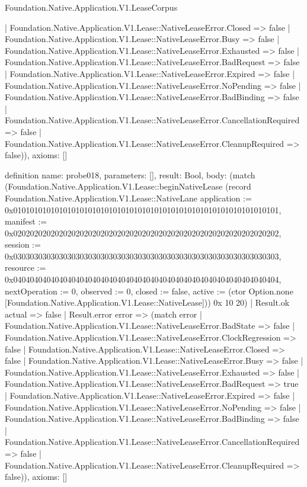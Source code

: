 \begin{lexlean}{Foundation.Native.Application.V1.LeaseCorpus}
\begin{semanticmodule}
{      | Foundation.Native.Application.V1.Lease::NativeLeaseError.Closed => false
      | Foundation.Native.Application.V1.Lease::NativeLeaseError.Busy => false
      | Foundation.Native.Application.V1.Lease::NativeLeaseError.Exhausted => false
      | Foundation.Native.Application.V1.Lease::NativeLeaseError.BadRequest => false
      | Foundation.Native.Application.V1.Lease::NativeLeaseError.Expired => false
      | Foundation.Native.Application.V1.Lease::NativeLeaseError.NoPending => false
      | Foundation.Native.Application.V1.Lease::NativeLeaseError.BadBinding => false
      | Foundation.Native.Application.V1.Lease::NativeLeaseError.CancellationRequired => false
      | Foundation.Native.Application.V1.Lease::NativeLeaseError.CleanupRequired => false)),
  axioms: []
}

definition{
  name: probe018,
  parameters: [],
  result: Bool,
  body: (match (Foundation.Native.Application.V1.Lease::beginNativeLease (record Foundation.Native.Application.V1.Lease::NativeLane {application := 0x0101010101010101010101010101010101010101010101010101010101010101, manifest := 0x0202020202020202020202020202020202020202020202020202020202020202, session := 0x0303030303030303030303030303030303030303030303030303030303030303, resource := 0x0404040404040404040404040404040404040404040404040404040404040404, nextOperation := 0, observed := 0, closed := false, active := (ctor Option.none [Foundation.Native.Application.V1.Lease::NativeLease])}) 0x 10 20)
    | Result.ok actual => false
    | Result.error error => (match error
      | Foundation.Native.Application.V1.Lease::NativeLeaseError.BadState => false
      | Foundation.Native.Application.V1.Lease::NativeLeaseError.ClockRegression => false
      | Foundation.Native.Application.V1.Lease::NativeLeaseError.Closed => false
      | Foundation.Native.Application.V1.Lease::NativeLeaseError.Busy => false
      | Foundation.Native.Application.V1.Lease::NativeLeaseError.Exhausted => false
      | Foundation.Native.Application.V1.Lease::NativeLeaseError.BadRequest => true
      | Foundation.Native.Application.V1.Lease::NativeLeaseError.Expired => false
      | Foundation.Native.Application.V1.Lease::NativeLeaseError.NoPending => false
      | Foundation.Native.Application.V1.Lease::NativeLeaseError.BadBinding => false
      | Foundation.Native.Application.V1.Lease::NativeLeaseError.CancellationRequired => false
      | Foundation.Native.Application.V1.Lease::NativeLeaseError.CleanupRequired => false)),
  axioms: []
}


\end{semanticmodule}
\end{lexlean}
